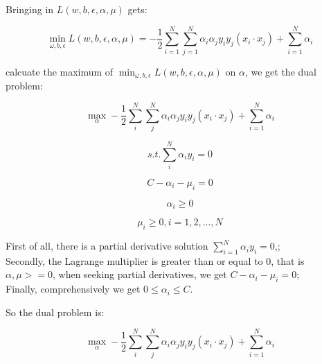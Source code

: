 \documentclass[oneside,solution]{seu-ml-assign}
\begin{document}
Bringing in $L(w,b,\epsilon,\alpha,\mu)$ gets:

\begin{equation}\min_{\omega,b,\epsilon}L(w,b,\epsilon,\alpha,\mu)=-\frac12\sum_{i=1}^N
  \sum_{j=1}^N\alpha_i\alpha_jy_iy_j\left(x_i\cdot x_j\right)+\sum_{i=1}^N\alpha_i
\end{equation}

calcuate the maximum of $\min_{\omega,b,\epsilon}L(w,b,\epsilon,\alpha,\mu)$ on $\alpha$, we get the dual problem:

\begin{equation}
  \max_{\alpha} -\frac{1}{2}\sum_{i}^{N}\sum_{j}^{N}\alpha_i\alpha_jy_iy_j(x_i \cdot x_j)+\sum_{i=1}^{N}\alpha_{i}
\end{equation}

\begin{equation}
  s.t.\sum_{i}^{N}\alpha_iy_i=0
\end{equation}

\begin{equation}
  C-\alpha_i-\mu_i=0
\end{equation}

\begin{equation}
  \alpha_i \geq 0
\end{equation}

\begin{equation}
  \mu_i \geq 0, i = 1,2,...,N
\end{equation}



First of all, there is a partial derivative solution $\sum_{i=1}^N\alpha_iy_i=0$,;\\
Secondly, the Lagrange multiplier is greater than or equal to 0, that is $\alpha, \mu >=0$,
when seeking partial derivatives, we get $C-\alpha_i-\mu_i=0$;\\
Finally, comprehensively we get $0\leq\alpha_i\leq C$.

So the dual problem is:

\begin{equation}
  \max_{\alpha} -\frac{1}{2}\sum_{i}^{N}\sum_{j}^{N}\alpha_i\alpha_jy_iy_j(x_i \cdot x_j)+\sum_{i=1}^{N}\alpha_{i}
\end{equation}
\end{document}

